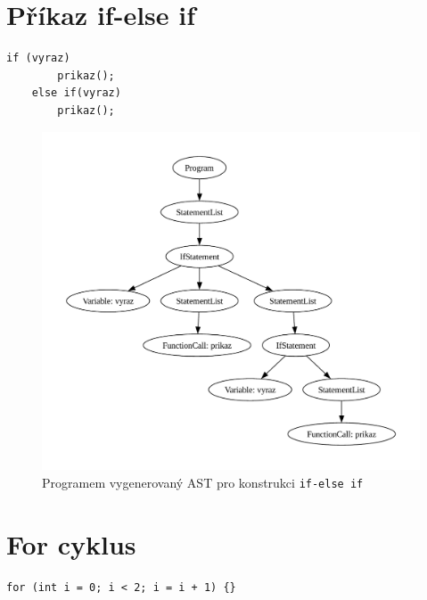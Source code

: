 \section{Příkaz if-else if}
\begin{lstlisting}[language=Koubp]
    if (vyraz)
        prikaz();
    else if(vyraz)
        prikaz();
\end{lstlisting}
\begin{figure}[ht]
    \centering
    \includegraphics[width=\textwidth]{obrazky-figures/ast_if_else_if.pdf}
    \caption{Programem vygenerovaný AST pro konstrukci \texttt{if-else if}}
    \label{fig_ast_else_if}
\end{figure}

\newpage

\section{For cyklus}

\begin{lstlisting}[language=Koubp]
	for (int i = 0; i < 2; i = i + 1) {}
\end{lstlisting}

\vspace{11em}

